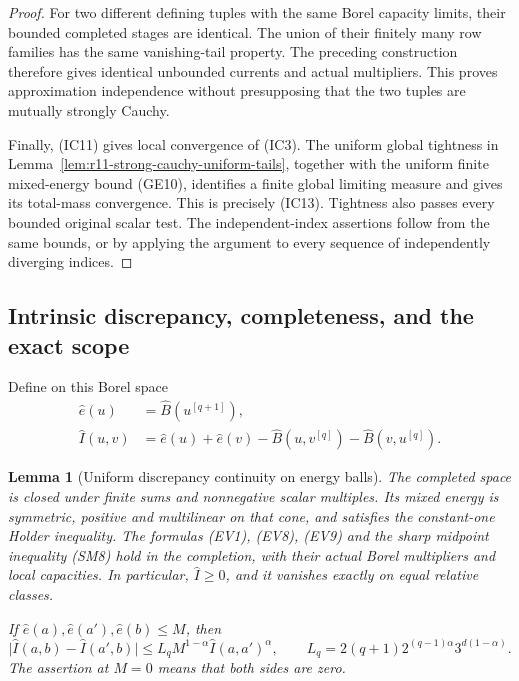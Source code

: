 \documentclass[11pt,a4paper]{article}
\numberwithin{equation}{section}
\newtheorem{lemma}[theorem]{Lemma}
\theoremstyle{definition}
\theoremstyle{remark}
\begin{document}
\begin{proof}
For two different defining tuples with the same Borel
capacity limits, their bounded completed stages are identical.
The union of their finitely many row families has the same
vanishing-tail property. The preceding construction therefore
gives identical unbounded currents and actual multipliers.
This proves approximation independence without presupposing
that the two tuples are mutually strongly Cauchy.

Finally, (IC11) gives local convergence of (IC3).
The uniform global tightness in
Lemma~\ref{lem:r11-strong-cauchy-uniform-tails}, together
with the uniform finite mixed-energy bound (GE10), identifies
a finite global limiting measure and gives its total-mass
convergence. This is precisely (IC13). Tightness also passes
every bounded original scalar test. The independent-index
assertions follow from the same bounds, or by applying the
argument to every sequence of independently diverging indices.
\end{proof}

\subsection{Intrinsic discrepancy, completeness, and the exact scope}

Define on this Borel space
\[
 \begin{split}
 \widehat e(u)&=\widehat B(u^{[q+1]}),\\
 \widehat I(u,v)&=\widehat e(u)+\widehat e(v)
       -\widehat B(u,v^{[q]})-\widehat B(v,u^{[q]}).
 \end{split}
 \tag{IC17}
\]

\begin{lemma}[Uniform discrepancy continuity on energy balls]
\label{lem:r11-discrepancy-uniform-perturbation}
The completed space is closed under finite sums and nonnegative
scalar multiples. Its mixed energy is symmetric, positive and
multilinear on that cone, and satisfies the constant-one Holder
inequality. The formulas (EV1), (EV8), (EV9) and the sharp
midpoint inequality (SM8) hold in the completion, with their
actual Borel multipliers and local capacities. In particular,
$\widehat I\geq0$, and it vanishes exactly on equal relative
classes.

If $\widehat e(a),\widehat e(a'),\widehat e(b)\leq M$,
then
\[
 \big|\widehat I(a,b)-\widehat I(a',b)\big|
       \leq L_q M^{1-\alpha}\widehat I(a,a')^\alpha,
 \qquad
 L_q=2(q+1)2^{(q-1)\alpha}3^{d(1-\alpha)}.
 \tag{IC18}
\]
The assertion at $M=0$ means that both sides are zero.
\end{lemma}
\end{document}
